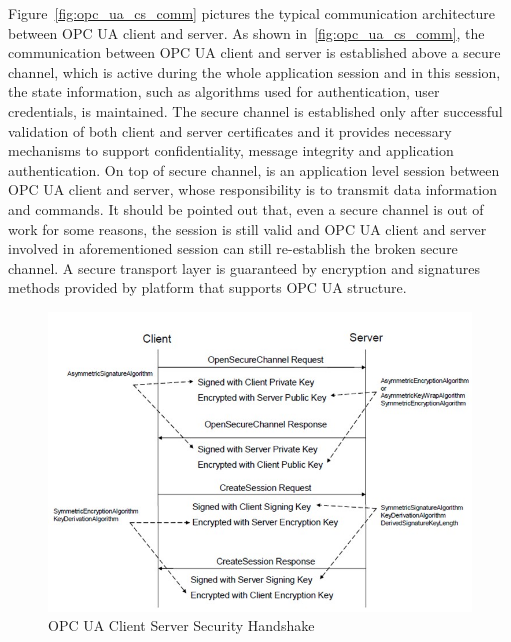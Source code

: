 Figure~\ref{fig:opc_ua_cs_comm} pictures the typical communication architecture between OPC UA client and server. As shown in~\ref{fig:opc_ua_cs_comm}, the communication between OPC UA client and server is established above a secure channel, which is active during the whole application session and in this session, the state information, such as algorithms used for authentication, user credentials, is maintained. The secure channel is established only after successful validation of both client and server certificates and it provides necessary mechanisms to support confidentiality, message integrity and application authentication. On top of secure channel, is an application level session between OPC UA client and server, whose responsibility is to transmit data information and commands. It should be pointed out that, even a secure channel is out of work for some reasons, the session is still valid and OPC UA client and server involved in aforementioned session can still re-establish the broken secure channel. A secure transport layer is guaranteed by encryption and signatures methods provided by platform that supports OPC UA structure.

\begin{figure}[!htbp]
	\centering
	\includegraphics[width=1\textwidth]{opc_ua_shs.jpg}
		\caption{OPC UA Client Server Security Handshake\cite{O2}}
	\label{fig:opc_ua_cs_shs}
\end{figure}

